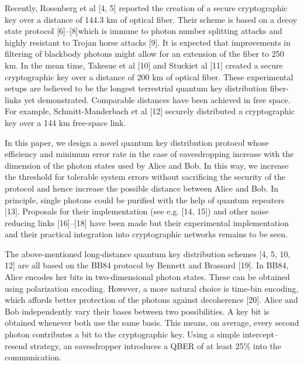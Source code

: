 Recently, Rosenberg et al [4, 5] reported the creation of a secure cryptographic key over a distance of 144.3 km of optical fiber. Their scheme is based on a decoy state protocol [6]–[8]which is immune to photon number splitting attacks and highly resistant to Trojan horse attacks [9]. It is expected that improvements in filtering of blackbody photons might allow for an extension of the fiber to 250 km. In the mean time, Takesue et al [10] and Stuckiet al [11] created a secure cryptographic key over a distance of 200 km of optical fiber. These experimental setups are believed to be the longest terrestrial quantum key distribution fiber-links yet demonstrated. Comparable distances have been achieved in free space. For example, Schmitt-Manderbach et al [12] securely distributed a cryptographic key over a
144 km free-space link.

In this paper, we design a novel quantum key distribution protocol whose efficiency and minimum error rate in the case of eavesdropping increase with the dimension of the photon states used by Alice and Bob. In this way, we increase the threshold for tolerable system errors without sacrificing the security of the protocol and hence increase the possible distance between Alice and Bob. In principle, single photons could be purified with the help of quantum repeaters [13]. Proposals for their implementation (see e.g. [14, 15]) and other noise reducing links [16]–[18] have been made but their experimental implementation and their practical integration into cryptographic networks remains to be seen.

The above-mentioned long-distance quantum key distribution schemes [4, 5, 10, 12] are all based on the BB84 protocol by Bennett and Brassard [19]. In BB84, Alice encodes her bits in two-dimensional photon states. These can be obtained using polarization encoding. However, a more natural choice is time-bin encoding, which affords better protection of the photons against decoherence [20]. Alice and Bob independently vary their bases between two possibilities. A key bit is obtained whenever both use the same basis. This means, on average, every second photon contributes a bit to the cryptographic key. Using a simple intercept–resend strategy, an eavesdropper introduces a QBER of at least 25\% into the communication.

